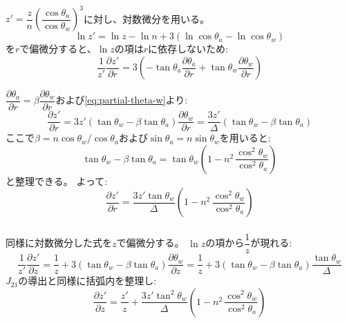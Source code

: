 \subsubsection{}

$z' = \dfrac{z}{n} \left( \dfrac{\cos \theta_a}{\cos \theta_w} \right)^3$に対し、対数微分を用いる。
\begin{equation}
  \ln z' = \ln z - \ln n + 3(\ln \cos \theta_a - \ln \cos \theta_w)
\end{equation}
を$r$で偏微分すると、$\ln z$の項は$r$に依存しないため:
\begin{equation}
  \frac{1}{z'} \frac{\partial z'}{\partial r} = 3 \left( -\tan \theta_a \frac{\partial \theta_a}{\partial r} + \tan \theta_w \frac{\partial \theta_w}{\partial r} \right)
\end{equation}

$\dfrac{\partial \theta_a}{\partial r} = \beta \dfrac{\partial \theta_w}{\partial r}$および\eqref{eq:partial-theta-w}より:
\begin{equation}
  \frac{\partial z'}{\partial r} = 3 z' \left( \tan \theta_w - \beta \tan \theta_a \right) \frac{\partial \theta_w}{\partial r} = \frac{3 z'}{\Delta} \left( \tan \theta_w - \beta \tan \theta_a \right)
\end{equation}
ここで$\beta = n \cos \theta_w / \cos \theta_a$および$\sin \theta_a = n \sin \theta_w$を用いると:
\begin{equation}
  \tan \theta_w - \beta \tan \theta_a = \tan \theta_w \left( 1 - n^2 \, \frac{\cos^2 \theta_w}{\cos^2 \theta_a} \right)
\end{equation}
と整理できる。
よって:
\begin{equation}\label{eq:J21}
  \frac{\partial z'}{\partial r} = \frac{3 z' \tan \theta_w}{\Delta} \left( 1 - n^2 \, \frac{\cos^2 \theta_w}{\cos^2 \theta_a} \right)
\end{equation}

\subsubsection{}

同様に対数微分した式を$z$で偏微分する。
$\ln z$の項から$\dfrac{1}{z}$が現れる:
\begin{equation}
  \frac{1}{z'} \frac{\partial z'}{\partial z} = \frac{1}{z} + 3 \left( \tan \theta_w - \beta \tan \theta_a \right) \frac{\partial \theta_w}{\partial z} = \frac{1}{z} + 3 \left( \tan \theta_w - \beta \tan \theta_a \right) \frac{\tan \theta_w}{\Delta}
\end{equation}
$J_{21}$の導出と同様に括弧内を整理し:
\begin{equation}\label{eq:J22}
  \frac{\partial z'}{\partial z} = \frac{z'}{z} + \frac{3 z' \tan^2 \theta_w}{\Delta} \left( 1 - n^2 \, \frac{\cos^2 \theta_w}{\cos^2 \theta_a} \right)
\end{equation}

